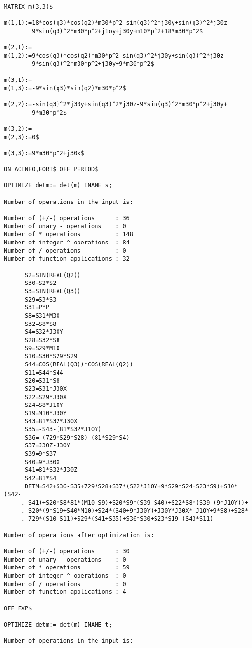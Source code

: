 {\small
\begin{verbatim}
MATRIX m(3,3)$

m(1,1):=18*cos(q3)*cos(q2)*m30*p^2-sin(q3)^2*j30y+sin(q3)^2*j30z-
        9*sin(q3)^2*m30*p^2+j1oy+j30y+m10*p^2+18*m30*p^2$

m(2,1):=
m(1,2):=9*cos(q3)*cos(q2)*m30*p^2-sin(q3)^2*j30y+sin(q3)^2*j30z-
        9*sin(q3)^2*m30*p^2+j30y+9*m30*p^2$

m(3,1):=
m(1,3):=-9*sin(q3)*sin(q2)*m30*p^2$

m(2,2):=-sin(q3)^2*j30y+sin(q3)^2*j30z-9*sin(q3)^2*m30*p^2+j30y+
        9*m30*p^2$

m(3,2):=
m(2,3):=0$

m(3,3):=9*m30*p^2+j30x$

ON ACINFO,FORT$ OFF PERIOD$

OPTIMIZE detm:=:det(m) INAME s;

Number of operations in the input is: 

Number of (+/-) operations      : 36
Number of unary - operations    : 0
Number of * operations          : 148
Number of integer ^ operations  : 84
Number of / operations          : 0
Number of function applications : 32

      S2=SIN(REAL(Q2))
      S30=S2*S2
      S3=SIN(REAL(Q3))
      S29=S3*S3
      S31=P*P
      S8=S31*M30
      S32=S8*S8
      S4=S32*J30Y
      S28=S32*S8
      S9=S29*M10
      S10=S30*S29*S29
      S44=COS(REAL(Q3))*COS(REAL(Q2))
      S11=S44*S44
      S20=S31*S8
      S23=S31*J30X
      S22=S29*J30X
      S24=S8*J1OY
      S19=M10*J30Y
      S43=81*S32*J30X
      S35=-S43-(81*S32*J1OY)
      S36=-(729*S29*S28)-(81*S29*S4)
      S37=J30Z-J30Y
      S39=9*S37
      S40=9*J30X
      S41=81*S32*J30Z
      S42=81*S4
      DETM=S42+S36-S35+729*S28+S37*(S22*J1OY+9*S29*S24+S23*S9)+S10*(S42-
     . S41)+S20*S8*81*(M10-S9)+S20*S9*(S39-S40)+S22*S8*(S39-(9*J1OY))+
     . S20*(9*S19+S40*M10)+S24*(S40+9*J30Y)+J30Y*J30X*(J1OY+9*S8)+S28*
     . 729*(S10-S11)+S29*(S41+S35)+S36*S30+S23*S19-(S43*S11)

Number of operations after optimization is:

Number of (+/-) operations      : 30
Number of unary - operations    : 0
Number of * operations          : 59
Number of integer ^ operations  : 0
Number of / operations          : 0
Number of function applications : 4

OFF EXP$

OPTIMIZE detm:=:det(m) INAME t;

Number of operations in the input is: 


\end{verbatim}}
